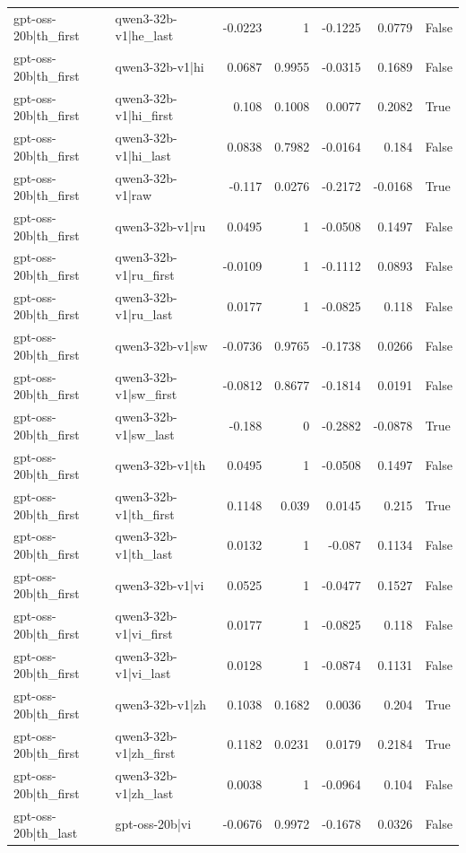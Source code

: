 \begin{table}
\begin{tabular}{l l r r r r l}
gpt-oss-20b|th_first & qwen3-32b-v1|he_last & -0.0223 & 1 & -0.1225 & 0.0779 & False \\
gpt-oss-20b|th_first & qwen3-32b-v1|hi & 0.0687 & 0.9955 & -0.0315 & 0.1689 & False \\
gpt-oss-20b|th_first & qwen3-32b-v1|hi_first & 0.108 & 0.1008 & 0.0077 & 0.2082 & True \\
gpt-oss-20b|th_first & qwen3-32b-v1|hi_last & 0.0838 & 0.7982 & -0.0164 & 0.184 & False \\
gpt-oss-20b|th_first & qwen3-32b-v1|raw & -0.117 & 0.0276 & -0.2172 & -0.0168 & True \\
gpt-oss-20b|th_first & qwen3-32b-v1|ru & 0.0495 & 1 & -0.0508 & 0.1497 & False \\
gpt-oss-20b|th_first & qwen3-32b-v1|ru_first & -0.0109 & 1 & -0.1112 & 0.0893 & False \\
gpt-oss-20b|th_first & qwen3-32b-v1|ru_last & 0.0177 & 1 & -0.0825 & 0.118 & False \\
gpt-oss-20b|th_first & qwen3-32b-v1|sw & -0.0736 & 0.9765 & -0.1738 & 0.0266 & False \\
gpt-oss-20b|th_first & qwen3-32b-v1|sw_first & -0.0812 & 0.8677 & -0.1814 & 0.0191 & False \\
gpt-oss-20b|th_first & qwen3-32b-v1|sw_last & -0.188 & 0 & -0.2882 & -0.0878 & True \\
gpt-oss-20b|th_first & qwen3-32b-v1|th & 0.0495 & 1 & -0.0508 & 0.1497 & False \\
gpt-oss-20b|th_first & qwen3-32b-v1|th_first & 0.1148 & 0.039 & 0.0145 & 0.215 & True \\
gpt-oss-20b|th_first & qwen3-32b-v1|th_last & 0.0132 & 1 & -0.087 & 0.1134 & False \\
gpt-oss-20b|th_first & qwen3-32b-v1|vi & 0.0525 & 1 & -0.0477 & 0.1527 & False \\
gpt-oss-20b|th_first & qwen3-32b-v1|vi_first & 0.0177 & 1 & -0.0825 & 0.118 & False \\
gpt-oss-20b|th_first & qwen3-32b-v1|vi_last & 0.0128 & 1 & -0.0874 & 0.1131 & False \\
gpt-oss-20b|th_first & qwen3-32b-v1|zh & 0.1038 & 0.1682 & 0.0036 & 0.204 & True \\
gpt-oss-20b|th_first & qwen3-32b-v1|zh_first & 0.1182 & 0.0231 & 0.0179 & 0.2184 & True \\
gpt-oss-20b|th_first & qwen3-32b-v1|zh_last & 0.0038 & 1 & -0.0964 & 0.104 & False \\
gpt-oss-20b|th_last & gpt-oss-20b|vi & -0.0676 & 0.9972 & -0.1678 & 0.0326 & False \\

\end{tabular}
\end{table}
